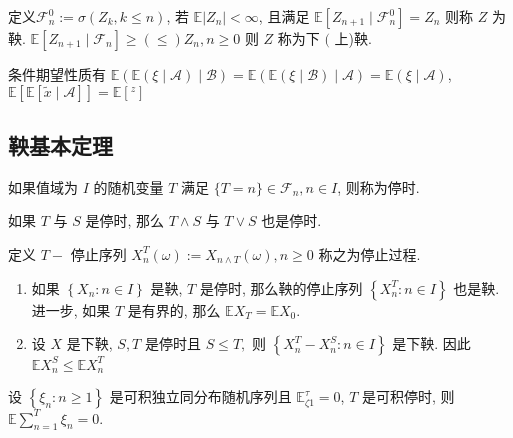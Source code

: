\documentclass[10pt]{yerbaformat}
\begin{document}
\begin{definition}
    定义$\mathcal{F}_{n}^{0}:=\sigma\left(Z_{k}, k \leq n\right)$, 若 $\mathbb{E}\left|Z_{n}\right|<\infty$, 且满足 $\mathbb{E}\left[Z_{n+1} \mid \mathcal{F}_{n}^{0}\right]=Z_{n}$ 则称 $Z$ 为鞅. $\mathbb{E}\left[Z_{n+1} \mid \mathcal{F}_{n}\right] \geq(\leq) Z_{n}, n \geq 0$ 则 $Z$ 称为下 $($ 上)鞅.
\end{definition}

\par 条件期望性质有 $\mathbb{E}(\mathbb{E}(\xi \mid \mathcal{A}) \mid \mathcal{B})=\mathbb{E}(\mathbb{E}(\xi \mid \mathcal{B}) \mid \mathcal{A})=\mathbb{E}(\xi \mid \mathcal{A})$, $\mathbb{E}[\mathbb{E}[\tilde{x} \mid \mathcal{A}]]=\mathbb{E}\left[{ }^{z}\right]$


\subsection{鞅基本定理}

\begin{definition}
    如果值域为 $I$ 的随机变量 $T$ 满足 $\{T=n\} \in \mathcal{F}_{n}, n \in I$, 则称为停时.
\end{definition}

\begin{lemma}
    如果 $T$ 与 $S$ 是停时, 那么 $T \wedge S$ 与 $T \vee S$ 也是停时.
\end{lemma}

\begin{definition}
    定义 $T-$ 停止序列 $X_{n}^{T}(\omega):=X_{n \wedge T}(\omega), n \geq 0$ 称之为停止过程.
\end{definition}

\begin{theorem}[有界停止定理]
    \begin{enumerate}
        \item 如果 $\left\{X_{n}: n \in I\right\}$ 是鞅, $T$ 是停时, 那么鞅的停止序列 $\left\{X_{n}^{T}: n \in I\right\}$ 也是鞅. 进一步, 如果 $T$ 是有界的, 那么 $\mathbb{E} X_{T}=\mathbb{E} X_{0}$.
        \item 设 $X$ 是下鞅, $S, T$ 是停时且 $S \leq T,$ 则 $\left\{X_{n}^{T}-X_{n}^{S}: n \in I\right\}$ 是下鞅. 因此 $\mathbb{E} X_{n}^{S} \leq \mathbb{E} X_{n}^{T}$
    \end{enumerate}
\end{theorem}

\begin{theorem}[Wald 等式]
    设 $\left\{\xi_{n}: n \geq 1\right\}$ 是可积独立同分布随机序列且 $\mathbb{E}_{\zeta 1}^{\tau}=0$, $T$ 是可积停时, 则 $\mathbb{E} \sum_{n=1}^{T} \xi_{n}=0 .$
\end{theorem}
\end{document}
